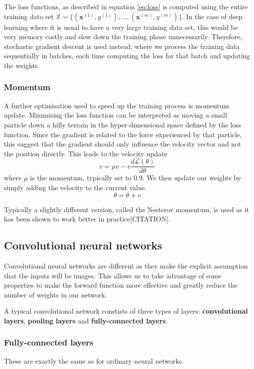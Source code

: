 \documentclass[12pt,a4paper,twoside,openright]{report}
\begin{document}
The loss functions, as described in equation \ref{eq:loss} is computed using the entire training data set $\mathbb{X} = \{(\mathbf{x}^{(1)},y^{(1)}), ...,(\mathbf{x}^{(m)},y^{(m)})\}$. In the case of deep learning where it is usual to have a very large training data set, this would be very memory costly and slow down the training phase unnecessarily. Therefore, stochastic gradient descent is used instead, where we process the training data sequentially in batches, each time computing the loss for that batch and updating the weights.

\subsubsection{Momentum}
A further optimisation used to speed up the training process is momentum update. Minimising the loss function can be interpreted as moving a small particle down a hilly terrain in the hyper-dimensional space defined by the loss function. Since the gradient is related to the force experienced by that particle, this suggest that the gradient should only influence the velocity vector and not the position directly. This leads to the velocity update
\begin{equation}
	v = \mu  v - \epsilon \frac{d\mathcal{L}(\theta)}{d\theta}
\end{equation}
where $\mu$ is the momentum, typically set to 0.9. We then update our weights by simply adding the velocity to the current value.
\begin{equation}
	\theta = \theta + v
\end{equation}

Typically a slightly different version, called the Nesterov momentum, is used as it has been shown to work better in practice[CITATION].

\subsection{Convolutional neural networks}
Convolutional neural networks are different as they make the explicit assumption that the inputs will be images. This allows us to take advantage of some properties to make the forward function more effective and greatly reduce the number of weights in our network. 

A typical convolutional network constists of three types of layers: \textbf{convolutional layers}, \textbf{pooling layers} and \textbf{fully-connected layers}. 
\subsubsection{Fully-connected layers}
These are exactly the same as for ordinary neural networks.
\end{document}
